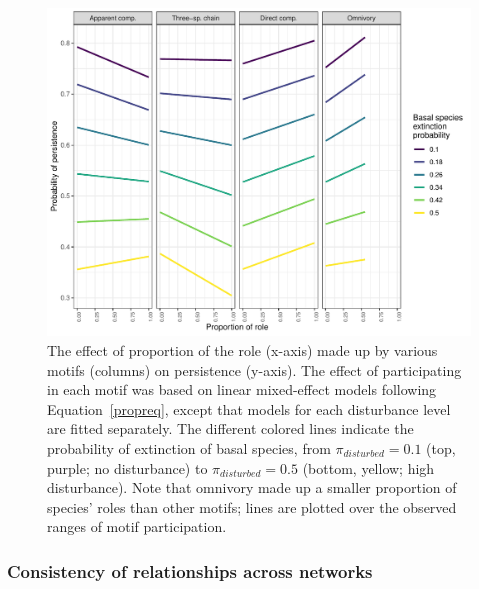 \documentclass[12pt]{article}
\begin{document}
\begin{spacing}{2.0}
            
            \begin{figure}[h!]
                \centering
                \includegraphics[width=\textwidth]{figures/prop_lmer_allCS.pdf}
                \caption{The effect of proportion of the role (x-axis) made up by various motifs (columns) on persistence (y-axis). The effect of participating in each motif was based on linear mixed-effect models following Equation~\ref{propreq}, except that models for each  disturbance level are fitted separately. The different colored lines indicate the probability of extinction of basal species, from $\pi_{disturbed} = 0.1$ (top, purple; no disturbance) to $\pi_{disturbed} = 0.5$ (bottom, yellow; high disturbance). Note that omnivory made up a smaller proportion of species' roles than other motifs; lines are plotted over the observed ranges of motif participation.}
                \label{fig:prop_lmer_all}
            \end{figure}
        
        \clearpage
    
        \subsubsection*{Consistency of  relationships across networks}
            

\end{spacing}
\end{document}

